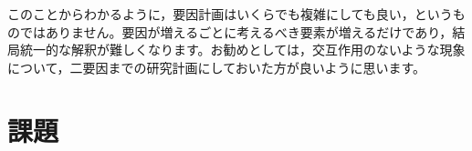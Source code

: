 \documentclass{ltjsarticle}
\begin{document}
このことからわかるように，要因計画はいくらでも複雑にしても良い，というものではありません。要因が増えるごとに考えるべき要素が増えるだけであり，結局統一的な解釈が難しくなります。お勧めとしては，交互作用のないような現象について，二要因までの研究計画にしておいた方が良いように思います。
\section{課題}
\end{document}
